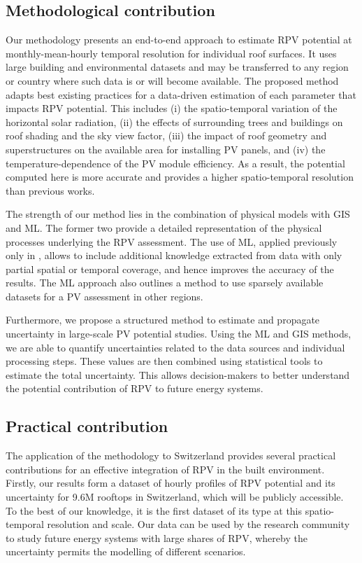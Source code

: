 \subsection{Methodological contribution}

Our methodology presents an end-to-end approach to estimate RPV potential at monthly-mean-hourly temporal resolution for individual roof surfaces. It uses large building and environmental datasets and may be transferred to any region or country where such data is or will become available. 
The proposed method adapts best existing practices for a data-driven estimation of each parameter that impacts RPV potential. This includes
(i) the spatio-temporal variation of the horizontal solar radiation,
(ii) the effects of surrounding trees and buildings on roof shading and the sky view factor,
(iii) the impact of roof geometry and superstructures on the available area for installing PV panels, and
(iv) the temperature-dependence of the PV module efficiency.
As a result, the potential computed here is more accurate and provides a higher spatio-temporal resolution than previous works.

The strength of our method lies in the combination of physical models with GIS and ML. The former two provide a detailed representation of the physical processes underlying the RPV assessment. The use of ML, applied previously only in \cite{assouline_quantifying_2017, assouline_large-scale_2018}, allows to include additional knowledge extracted from data with only partial spatial or temporal coverage, and hence improves the accuracy of the results. 
The ML approach also outlines a method to use sparsely available datasets for a PV assessment in other regions.

Furthermore, we propose a structured method to estimate and propagate uncertainty in large-scale PV potential studies. Using the ML and GIS methods, we are able to quantify uncertainties related to the data sources and individual processing steps. These values are then combined using statistical tools to estimate the total uncertainty.
This allows decision-makers to better understand the potential contribution of RPV to future energy systems. 


\subsection{Practical contribution}

The application of the methodology to Switzerland provides several practical contributions for an effective integration of RPV in the built environment. 
Firstly, our results form a dataset of hourly profiles of RPV potential and its uncertainty for 9.6M rooftops in Switzerland, which will be publicly accessible. To the best of our knowledge, it is the first dataset of its type at this spatio-temporal resolution and scale. Our data can be used by the research community to study future energy systems with large shares of RPV, whereby the uncertainty permits the modelling of different scenarios. 

